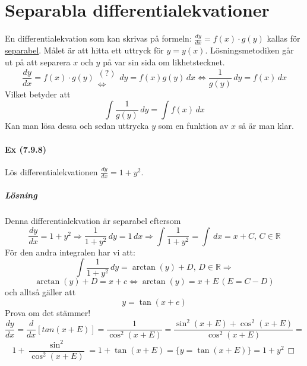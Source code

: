 \section{Separabla differentialekvationer}
En differentialekvation som kan skrivas på formeln: $\frac{dy}{dx}=f(x)\cdot g(y)$ kallas för \underline{separabel}.
Målet är att hitta ett uttryck för $y=y(x)$.
Lösningsmetodiken går ut på att separera $x$ och $y$ på var sin sida om likhetstecknet.
\begin{equation*}
    \frac{dy}{dx}=f(x)\cdot g(y)\begin{matrix}(?)\\\Leftrightarrow\end{matrix}
    dy=f(x)g(y)\, dx\Leftrightarrow
    \frac{1}{g(y)}\, dy=f(x)\, dx
\end{equation*}
Vilket betyder att
\begin{equation*}
    \int\frac{1}{g(y)}\, dy=\int f(x)\, dx
\end{equation*}
Kan man lösa dessa och sedan uttrycka $y$ som en funktion av $x$ så är man klar.

\paragraph{Ex (7.9.8)} Lös differentialekvationen $\frac{dy}{dx}=1+y^2$.
\subparagraph{Lösning}
Denna differentialekvation är separabel eftersom
\begin{equation*}
    \frac{dy}{dx}=1+y^2\Rightarrow
    \frac{1}{1+y^2}\, dy=1\, dx\Rightarrow
    \int\frac{1}{1+y^2}=\int\, dx=x+C,\, C\in\mathbb{R}
\end{equation*}
För den andra integralen har vi att:
\begin{equation*}
    \int\frac{1}{1+y^2}\, dy=
    \arctan(y)+D,\, D\in\mathbb{R}\Rightarrow
\end{equation*}
\begin{equation*}
    \arctan(y)+D=x+c\Leftrightarrow
    \arctan(y)=x+E\, (E=C-D)
\end{equation*}
och alltså gäller att
\begin{equation*}
    y=\tan(x+e)
\end{equation*}
Prova om det stämmer!
\begin{equation*}
    \frac{dy}{dx}=
    \frac{d}{dx}[tan(x+E)]=
    \frac{1}{\cos^2(x+E)}=
    \frac{\sin^2(x+E)+\cos^2(x+E)}{\cos^2(x+E)}=
\end{equation*}
\begin{equation*}
    1+\frac{\sin^2}{\cos^2(x+E)}=
    1+\tan(x+E)=
    \{y=\tan(x+E)\}=1+y^2\, \Box
\end{equation*}

